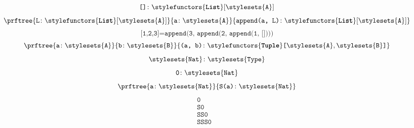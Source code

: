 \begin{forslides}
\begin{equation}
    \end{equation}
    \begin{equation}
        \label{eq:typecon_2_session1_22}
        \texttt{[]}\colon \stylefunctors{\textbf{\texttt{List}}}[\stylesets{\texttt{A}}]
    \end{equation}
    \begin{equation}
        \label{eq:typecon_3_session1_22}
        \prftree{\texttt{L}\colon \stylefunctors{\textbf{\texttt{List}}}[\stylesets{\texttt{A}}]}{\texttt{a}\colon \stylesets{\texttt{A}}}{\texttt{append(a, L)}\colon \stylefunctors{\textbf{\texttt{List}}}[\stylesets{\texttt{A}}]}
    \end{equation}
    \begin{equation}
        \label{eq:typecon_4_session1_22}
        \texttt{[1,2,3]} = \texttt{append(3, append(2, append(1, [])))}
    \end{equation}
    \begin{equation}
        \label{eq:typecon_5_session1_22}
        \prftree{\texttt{a}\colon \stylesets{\texttt{A}}}
        {\texttt{b}\colon \stylesets{\texttt{B}}}
        {\texttt{(a, b)}\colon \stylefunctors{\textbf{\texttt{Tuple}}}\texttt{[}\stylesets{\texttt{A}},\stylesets{\texttt{B}}\texttt{]}}
    \end{equation}
    \begin{equation}
        \label{eq:typecon_6_session1_22}
        \stylesets{\texttt{Nat}}\colon \stylesets{\texttt{Type}}
    \end{equation}
    \begin{equation}
        \label{eq:typecon_7_session1_22}
        \texttt{0}\colon \stylesets{\texttt{Nat}}
    \end{equation}
    \begin{equation}
        \label{eq:typecon_8_session1_22}
        \prftree{\texttt{a}\colon \stylesets{\texttt{Nat}}}
        {\texttt{S(a)}\colon \stylesets{\texttt{Nat}}}
    \end{equation}
    \begin{equation}
        \label{eq:typecon_9_session1_22}
        \begin{aligned}
            \texttt{0}    & \\
            \texttt{S0}   & \\
            \texttt{SS0}  & \\
            \texttt{SSS0} &
        \end{aligned}
    \end{equation}


\end{forslides}
